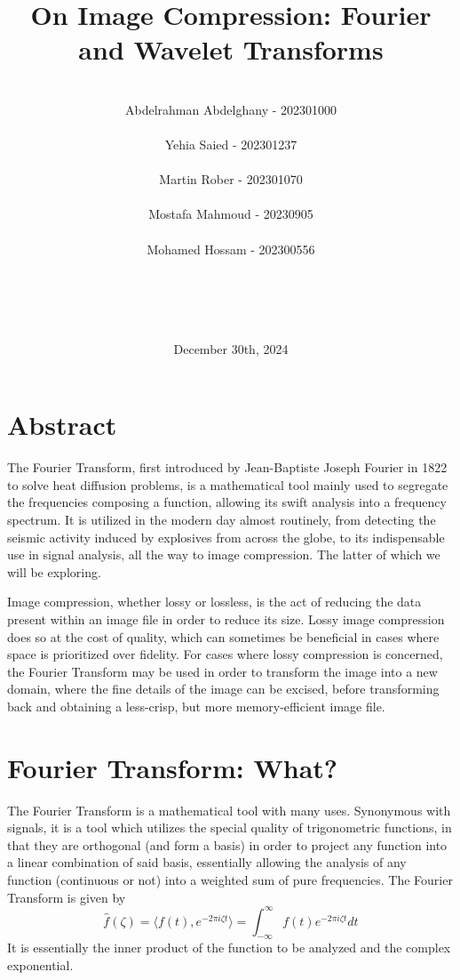 \documentclass{article}
\title{On Image Compression: Fourier and Wavelet Transforms}
\author{ \\ Abdelrahman Abdelghany - 202301000 \\ \\ Yehia Saied - 202301237 \\ \\ Martin Rober - 202301070 \\ \\ Mostafa Mahmoud - 20230905 \\ \\ Mohamed Hossam - 202300556 \\ \\ \\ \\ \\  }
\date{December 30th, 2024}
\begin{document}
\maketitle

\newpage
\section*{Abstract}
The Fourier Transform, first introduced by Jean-Baptiste Joseph Fourier in 1822 to solve heat diffusion problems, 
is a mathematical tool mainly used to segregate the frequencies composing a function, allowing its swift analysis 
into a frequency spectrum. It is utilized in the modern day almost routinely, from detecting the seismic activity 
induced by explosives from across the globe, to its indispensable use in signal analysis, all the way to image 
compression. The latter of which we will be exploring.

Image compression, whether lossy or lossless, is the act of reducing the data present within an image file in order 
to reduce its size. Lossy image compression does so at the cost of quality, which can sometimes be beneficial in 
cases where space is prioritized over fidelity. For cases where lossy compression is concerned, the Fourier 
Transform may be used in order to transform the image into a new domain, where the fine details of the image 
can be excised, before transforming back and obtaining a less-crisp, but more memory-efficient image file.

\newpage
\section*{Fourier Transform: What?}
The Fourier Transform is a mathematical tool with many uses. Synonymous with signals, it is a tool which 
utilizes the special quality of trigonometric functions, in that they are orthogonal (and form a basis) in 
order to project any function into a linear combination of said basis, essentially allowing the analysis of
any function (continuous or not) into a weighted sum of pure frequencies.
\newline \newline
The Fourier Transform is given by
$$\hat{f}(\zeta) = \langle f(t), e^{-2\pi i \zeta t} \rangle = \int_{-\infty}^{\infty} f(t) e^{-2\pi i \zeta t} dt$$
It is essentially the inner product of the function to be analyzed and the complex exponential.
\end{document}
